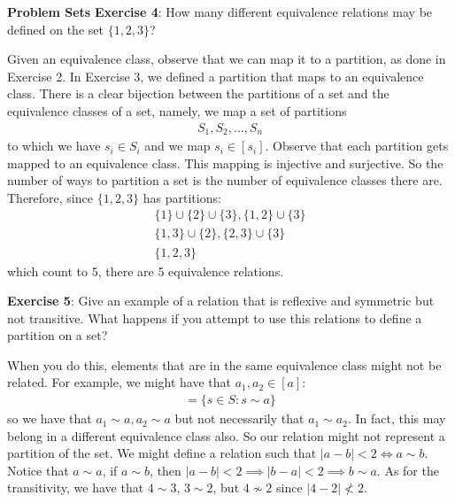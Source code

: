 \documentclass{report}
\begin{document}
\begin{exercises}{\textbf{Problem Sets}}
    \textbf{Exercise 4}: How many different equivalence relations may be defined on the set $\{1, 2, 3\}$?

    \begin{answer}
        Given an equivalence class, observe that we can map it to a partition, as done in Exercise 2. In Exercise 3, we defined a partition that maps to an equivalence class. There is a clear bijection between the partitions of a set and the equivalence classes of a set, namely, we map a set of partitions
        \begin{align*}
            {S_{1}, S_{2}, \ldots, S_{n}}
        \end{align*}
        to which we have $s_{i} \in S_{i}$ and we map $s_{i} \in [s_{i}]$. Observe that each partition gets mapped to an equivalence class. This mapping is injective and surjective. So the number of ways to partition a set is the number of equivalence classes there are. Therefore, since $\{1, 2, 3\}$ has partitions:
        \begin{gather*}
            \{1\} \cup \{2\} \cup \{3\}, \{1, 2\} \cup \{3\} \\
            \{1, 3\} \cup \{2\}, \{2, 3\} \cup \{3\} \\
            \{1, 2, 3\}
        \end{gather*}
        which count to 5, there are 5 equivalence relations.
    \end{answer}

    \textbf{Exercise 5}: Give an example of a relation that is reflexive and symmetric but not transitive. What happens if you attempt to use this relations to define a partition on a set?

    \begin{answer}
        When you do this, elements that are in the same equivalence class might not be related. For example, we might have that $a_{1}, a_{2} \in [a]$:
        \begin{align*}
            [a] = \{s \in S : s \sim a\}
        \end{align*}
        so we have that $a_{1} \sim a, a_{2} \sim a$ but not necessarily that $a_{1} \sim a_{2}$. In fact, this may belong in a different equivalence class also. So our relation might not represent a partition of the set. We might define a relation such that $\lvert a - b \rvert < 2 \iff a \sim b$. Notice that $a \sim a$, if $a \sim b$, then $\lvert a - b \rvert < 2 \implies \lvert b - a \rvert < 2 \implies b \sim a$. As for the transitivity, we have that $4 \sim 3$, $3 \sim 2$, but $4 \not\sim 2$ since $\lvert 4 - 2 \rvert \not< 2$.
    \end{answer}


\end{exercises}
\end{document}
